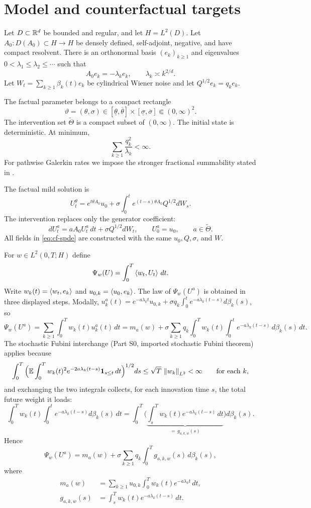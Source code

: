 \section{Model and counterfactual targets}\label{sec:model}

Let $D\subset\mathbb R^d$ be bounded and regular, and let $H=L^2(D)$. Let $A_0:D(A_0)\subset H\to H$ be densely defined, self-adjoint, negative, and have compact resolvent. There is an orthonormal basis $(e_k)_{k\ge1}$ and eigenvalues $0<\lambda_1\le\lambda_2\le\cdots$ such that
\[
 A_0e_k=-\lambda_ke_k,
 \qquad
 \lambda_k\asymp k^{2/d}.
\]
Let $W_t=\sum_{k\ge1}\beta_k(t)e_k$ be cylindrical Wiener noise and let $Q^{1/2}e_k=q_ke_k$.

\begin{assumption}\label{ass:core}
The factual parameter belongs to a compact rectangle
\[
 \vartheta=(\theta,\sigma)\in
 [\underline\theta,\overline\theta]\times
 [\underline\sigma,\overline\sigma]\Subset(0,\infty)^2.
\]
The intervention set $\widetilde\Theta$ is a compact subset of $(0,\infty)$. The initial state is deterministic. At minimum,
\[
 \sum_{k\ge1}\frac{q_k^2}{\lambda_k}<\infty.
\]
For pathwise Galerkin rates we impose the stronger fractional summability stated in .
\end{assumption}

The factual mild solution is
\[
 U_t^\theta
 =e^{t\theta A_0}u_0
 +\sigma\int_0^t e^{(t-s)\theta A_0}Q^{1/2}dW_s.
\]
The intervention replaces only the generator coefficient:
\begin{equation}\label{eq:cf-spde}
 dU_t^{a}=aA_0U_t^{a}\,dt+\sigma Q^{1/2}dW_t,
 \qquad U_0^a=u_0,
 \qquad a\in\widetilde\Theta.
\end{equation}
All fields in \eqref{eq:cf-spde} are constructed with the same $u_0,Q,\sigma$, and $W$.

For $w\in L^2(0,T;H)$ define
\[
 \Psi_w(U)=\int_0^T\left\langle w_t,U_t\right\rangle\,dt.
\]
Write $w_k(t)=\left\langle w_t,e_k\right\rangle$ and $u_{0,k}=\left\langle u_0,e_k\right\rangle$. The law of $\Psi_w(U^a)$ is obtained in three displayed steps. Modally, $u^a_k(t)=e^{-a\lambda_kt}u_{0,k}+\sigma q_k\int_0^te^{-a\lambda_k(t-s)}d\beta_k(s)$, so
\[
 \Psi_w(U^a)
 =\sum_{k\ge1}\int_0^Tw_k(t)u^a_k(t)\,dt
 =m_a(w)+\sigma\sum_{k\ge1}q_k\int_0^T\!\!w_k(t)\!\int_0^t
 e^{-a\lambda_k(t-s)}\,d\beta_k(s)\,dt .
\]
The stochastic Fubini interchange (Part S0, imported stochastic Fubini theorem) applies because
\[
 \int_0^T\Big(\mathbb E\int_0^T w_k(t)^2e^{-2a\lambda_k(t-s)}\mathbf 1_{s\le t}\,dt\Big)^{1/2}ds
 \le\sqrt T\,\left\lVert w_k\right\rVert_{L^2}<\infty
 \qquad\text{for each }k,
\]
and exchanging the two integrals collects, for each innovation time $s$, the total future weight it loads:
\[
 \int_0^T\!\!w_k(t)\!\int_0^te^{-a\lambda_k(t-s)}d\beta_k(s)\,dt
 =\int_0^T\Big(\underbrace{\int_s^Tw_k(t)e^{-a\lambda_k(t-s)}\,dt}_{=\,g_{a,k,w}(s)}\Big)d\beta_k(s).
\]
Hence
\[
 \Psi_w(U^a)
 =m_a(w)+\sigma\sum_{k\ge1}q_k
 \int_0^T g_{a,k,w}(s)\,d\beta_k(s),
\]
where
\begin{align}
 m_a(w)
 &=\sum_{k\ge1}u_{0,k}\int_0^T w_k(t)e^{-a\lambda_kt}\,dt,\label{eq:mean}\\
 g_{a,k,w}(s)
 &=\int_s^T w_k(t)e^{-a\lambda_k(t-s)}\,dt.\label{eq:transfer}
\end{align}

